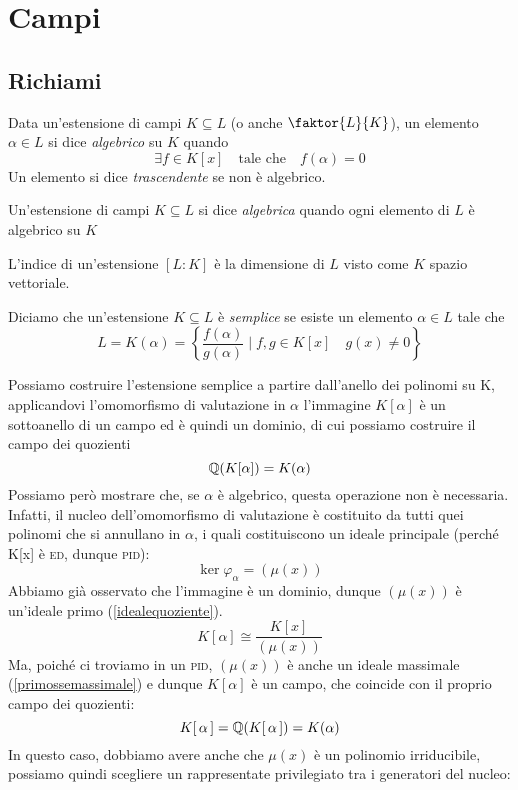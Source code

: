\setcounter{section}{10} %
\section{Campi}

\subsection{Richiami}
\begin{multicols}{2}

\begin{definition}
	Data un'estensione di campi $ K \subseteq L $ (o anche $ \faktor{L}{K} $), un elemento $ \alpha \in L $ si dice \emph{algebrico} su $ K $ quando 
	\[ \exists f \in K[x] \quad \text{tale che} \quad f(\alpha) = 0 \]
	Un elemento si dice \emph{trascendente} se non è algebrico.
\end{definition}

\begin{definition}
	Un'estensione di campi $ K \subseteq L $ si dice \emph{algebrica} quando ogni elemento di $ L $ è algebrico su $ K $
\end{definition}

\begin{definition}
	L'indice di un'estensione $ [L:K] $ è la dimensione di $ L $ visto come $ K $ spazio vettoriale.
\end{definition}

\begin{definition}
	Diciamo che un'estensione $ K \subseteq L $ è \emph{semplice} se esiste un elemento $ \alpha \in L $ tale che
	\[ L = K(\alpha) = \left\{ \frac{f(\alpha)}{g(\alpha)} \mid f, g \in K[x] \quad g(x) \neq 0  \right\} \]
\end{definition}

Possiamo costruire l'estensione semplice a partire dall'anello dei polinomi su K, applicandovi l'omomorfismo di valutazione in $ \alpha $
l'immagine $ K[\alpha] $ è un sottoanello di un campo ed è quindi un dominio, di cui possiamo costruire il campo dei quozienti
\[ \mathbb{Q}(K[\alpha]) = K(\alpha) \]
Possiamo però mostrare che, se $ \alpha $ è algebrico, questa operazione non è necessaria. Infatti, il nucleo dell'omomorfismo di valutazione è costituito da tutti quei polinomi che si annullano in $ \alpha $, i quali costituiscono un ideale principale (perché K[x] è \textsc{ed}, dunque \textsc{pid}):
\[ \ker\varphi_\alpha = (\mu(x)) \]
Abbiamo già osservato che  l'immagine è un dominio, dunque $ (\mu(x)) $ è un'ideale primo (\ref{idealequoziente}).
\[ K[\alpha] \cong \frac{K[x]}{(\mu(x))} \]
Ma, poiché ci troviamo in un \textsc{pid}, $ (\mu(x)) $ è anche un ideale massimale (\ref{primossemassimale}) e dunque $ K[\alpha] $ è un campo, che coincide con il proprio campo dei quozienti:
\[ K[\,\alpha\,] = \mathbb{Q}(K[\,\alpha\,]) = K(\alpha) \]
In questo caso, dobbiamo avere anche che $ \mu(x) $ è un polinomio irriducibile, possiamo quindi scegliere un rappresentate privilegiato tra i generatori del nucleo:


\end{multicols}
